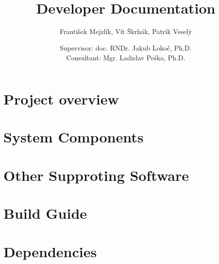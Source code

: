 \documentclass[10pt,a4paper]{report}
\title{\textcool{\bf SOMHunter Video Search Tool} \\ Developer Documentation}
\author{František Mejzlík, Vít Škrhák, Patrik Veselý}
\date{Supervisor: doc. RNDr. Jakub Lokoč, Ph.D. \\ \vspace{5mm} Consultant: Mgr. Ladislav Peška, Ph.D.}
\begin{document}
\maketitle

\tableofcontents




\part{Project overview}




\part{System Components}








\part{Other Supproting Software}



\part{Build Guide}


\part{Dependencies}


 


\printindex
\begin{appendices}

\end{appendices}
\end{document}

